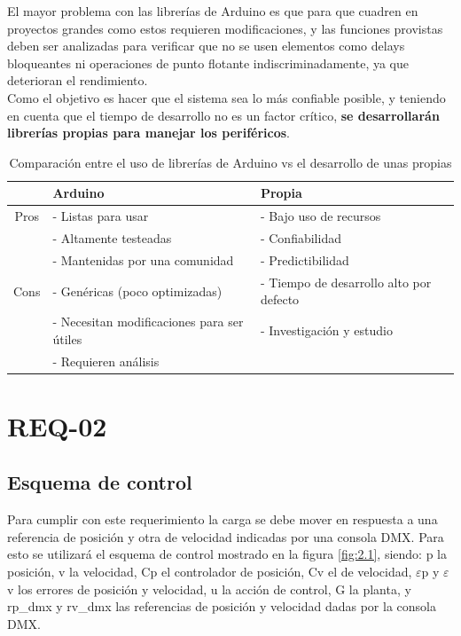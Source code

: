 El mayor problema con las librerías de Arduino es que para que cuadren en proyectos grandes como estos requieren modificaciones, y las funciones provistas deben ser analizadas para verificar que no se usen elementos como delays bloqueantes ni operaciones de punto flotante indiscriminadamente, ya que deterioran el rendimiento. \\
Como el objetivo es hacer que el sistema sea lo más confiable posible, y teniendo en cuenta que el tiempo de desarrollo no es un factor crítico, \textbf{se desarrollarán librerías propias para manejar los periféricos}.\\

\begin{table}[!ht]
	\begin{center}
		\begin{tabular}{|c|l|l|}
			\hline
			\textbf{} & \textbf{Arduino} & \textbf{Propia} \\
			\hline \hline
			Pros & - Listas para usar & - Bajo uso de recursos \\
			& - Altamente testeadas  & - Confiabilidad \\
			& - Mantenidas por una comunidad & - Predictibilidad \\
			\hline
			Cons & - Genéricas (poco optimizadas) & - Tiempo de desarrollo alto por defecto \\
			& - Necesitan modificaciones para ser útiles & - Investigación y estudio \\
			& - Requieren análisis &   \\
			\hline
		\end{tabular}
	\end{center}
	\caption{Comparación entre el uso de librerías de Arduino vs el desarrollo de unas propias}
	\label{table:\thetable}
\end{table}

\section{REQ-02} \label{sec:\thesection}
\subsection{Esquema de control}
Para cumplir con este requerimiento la carga se debe mover en respuesta a una referencia de posición y otra de velocidad indicadas por una consola DMX. Para esto se utilizará el esquema de control mostrado en la figura \ref{fig:2.1}, siendo: p la posición, v la velocidad,  Cp el controlador de posición, Cv el de velocidad, \(\varepsilon\)p y \(\varepsilon\)v los errores de posición y velocidad, u la acción de control, G la planta, y rp\_dmx y rv\_dmx las referencias de posición y velocidad dadas por la consola DMX.   \\

